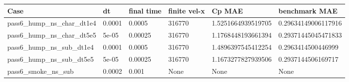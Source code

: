 \begin{tabular}{llllll}
\toprule
Case & dt & final time & finite vel-x & Cp MAE & benchmark MAE\\
\midrule
pass6\_hump\_ns\_char\_dt1e4 & 0.0001 & 0.0005 & 316770 & 1.5251664939519705 & 0.29634149006117916\\
pass6\_hump\_ns\_char\_dt5e5 & 5e-05 & 0.00025 & 316770 & 1.1768448193661394 & 0.29371445045471833\\
pass6\_hump\_ns\_sub\_dt1e4 & 0.0001 & 0.0005 & 316770 & 1.4896397545412254 & 0.2963414500446999\\
pass6\_hump\_ns\_sub\_dt5e5 & 5e-05 & 0.00025 & 316770 & 1.1673277827939506 & 0.2937144506169717\\
pass6\_smoke\_ns\_sub & 0.0002 & 0.001 & None & None & None\\
\bottomrule
\end{tabular}
